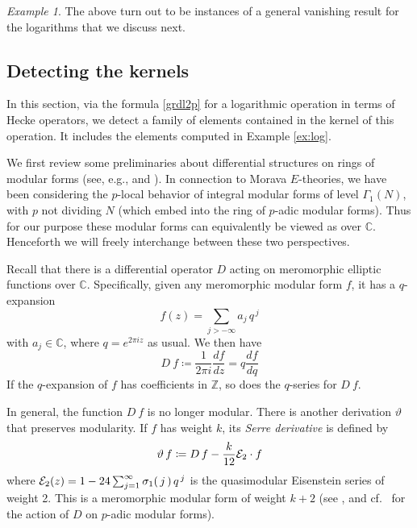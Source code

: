 \documentclass{gtpart}
\theoremstyle{definition}
\theoremstyle{remark}
\newtheorem{ex}[thm]{Example}
\newcommand{\mb}[1]{\mathbb{#1}}
\newcommand{\CE}{{\cal E}}
\newcommand{\BC}{{\mb C}}
\newcommand{\BZ}{{\mb Z}}
\newcommand{\G}{\Gamma}
\newcommand{\si}{\sigma}
\newcommand{\ce}{\coloneqq}
\renewcommand{\=}{\approx}
\renewcommand{\-}{\sim}
\numberwithin{equation}{section}
\numberwithin{thm}{section}
\begin{document}
\begin{ex}
 The above turn out to be instances of a general vanishing result for the 
 logarithms that we discuss next.  
\end{ex}



\subsection{Detecting the kernels}
\label{subsec:thm}

In this section, via the formula \eqref{grdl2p} for a logarithmic operation in 
terms of Hecke operators, we detect a family of elements contained in the kernel 
of this operation.  It includes the elements computed in Example \ref{ex:log}.  

We first review some preliminaries about differential structures on rings of 
modular forms (see, e.g., \cite[\S 5]{1-2-3} and \cite[Section 2.3]{web}).  In 
connection to Morava $E$-theories, we have been considering the $p$-local 
behavior of integral modular forms of level $\G_1(N)$, with $p$ not dividing $N$ 
(which embed into the ring of $p$-adic modular forms).  Thus for our purpose 
these modular forms can equivalently be viewed as over $\BC$.  Henceforth we 
will freely interchange between these two perspectives.  

Recall that there is a differential operator $D$ acting on meromorphic elliptic 
functions over $\BC$.  Specifically, given any meromorphic modular form $f$, it 
has a $q$-expansion 
\[
 f(z) = \sum_{j > -\infty} a_j \, q^{\,j} 
\]
with $a_j \in \BC$, where $q = e^{2 \pi i z}$ as usual.  We then have 
\begin{equation}
 \label{ramanujan}
 D ~\! f \ce \frac{1}{2 \pi i} \frac{df}{dz} = q \frac{df}{dq} 
\end{equation}
If the $q$-expansion of $f$ has coefficients in $\BZ$, so does the $q$-series 
for $D ~\! f$.  

In general, the function $D ~\! f$ is no longer modular.  There is another 
derivation $\vartheta$ that preserves modularity.  If $f$ has weight $k$, its 
{\em Serre derivative} is defined by 
\begin{equation}
 \label{serre}
 \vartheta ~\! f \ce D ~\! f - \frac{k}{12} \CE_2 \cdot f 
\end{equation}
where $\CE_2(z) = 1 - 24 \sum_{j = 1}^\infty \si_1(\,j\,) \, q^{\,j}$ is the 
quasimodular Eisenstein series of weight 2.  This is a meromorphic modular form 
of weight $k + 2$ (see \cite[Proposition 2.11]{web}, and 
cf.~\cite[Th\'eor\`eme 5(a)]{fmpadiq} for the action of $D$ on $p$-adic modular 
forms).  
\end{document}
